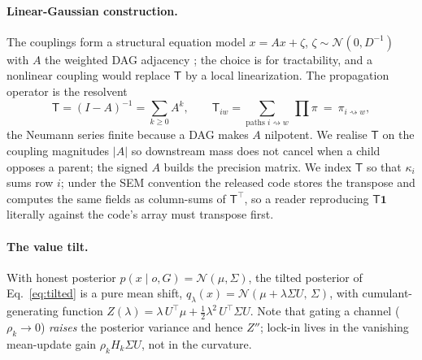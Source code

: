 \documentclass[11pt]{article}
\newcommand{\rw}{\rightsquigarrow}
\newcommand{\Top}{\mathsf{T}}          %
\newcommand{\bone}{\mathbf{1}}         %
\begin{document}
\paragraph{Linear-Gaussian construction.} The couplings form a structural equation model $x=Ax+\zeta$,
$\zeta\sim\mathcal N(0,D^{-1})$ with $A$ the weighted DAG adjacency \citep{koller2009}; the choice is
for tractability, and a nonlinear coupling would replace $\Top$ by a local linearization. The
propagation operator is the resolvent
\begin{equation}
\Top=(I-A)^{-1}=\sum_{k\ge 0}A^k,\qquad
\Top_{iw}=\!\!\sum_{\text{paths }i\rw w}\ \prod \pi\ =\ \pi_{i\rw w},
\label{eq:Top-full}
\end{equation}
the Neumann series finite because a DAG makes $A$ nilpotent. We realise $\Top$ on the coupling
magnitudes $|A|$ so downstream mass does not cancel when a child opposes a parent; the signed $A$
builds the precision matrix. We index $\Top$ so that $\kappa_i$ sums row $i$; under the SEM
convention the released code stores the transpose and computes the same fields as column-sums of
$\Top^{\!\top}$, so a reader reproducing $\Top\bone$ literally against the code's array must
transpose first.

\paragraph{The value tilt.} With honest posterior $p(x\mid o,G)=\mathcal N(\mu,\Sigma)$, the tilted
posterior of Eq.~\eqref{eq:tilted} is a pure mean shift,
$q_\lambda(x)=\mathcal N(\mu+\lambda\Sigma U,\,\Sigma)$, with cumulant-generating function
$Z(\lambda)=\lambda\,U^{\!\top}\!\mu+\tfrac12\lambda^2\,U^{\!\top}\!\Sigma U$. Note that gating a
channel ($\rho_k\to0$) \emph{raises} the posterior variance and hence $Z''$; lock-in lives in the
vanishing mean-update gain $\rho_k H_k\Sigma U$, not in the curvature.
\end{document}
